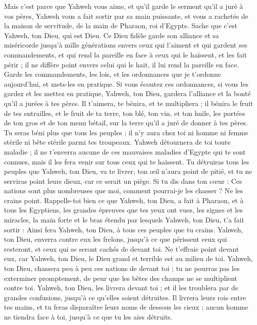 \begin{multicols}{2}
Mais c'est parce que Yahweh vous aime, et qu'il garde le serment qu’il a juré à vos pères, Yahweh vous a fait sortir par sa main puissante, et vous a rachetés de la maison de servitude, de la main de Pharaon, roi d'Egypte.
Sache que c'est Yahweh, ton Dieu, qui est Dieu. Ce Dieu fidèle garde son alliance et sa miséricorde jusqu'à mille générations envers ceux qui l'aiment et qui gardent ses commandements,
et qui rend la pareille en face à ceux qui le haïssent, et les fait périr ; il ne diffère point envers celui qui le hait, il lui rend la pareille en face.
Garde les commandements, les lois, et les ordonnances que je t’ordonne aujourd'hui, et mets-les en pratique.
Si vous écoutez ces ordonnances, si vous les gardez et les mettez en pratique, Yahweh, ton Dieu, gardera l'alliance et la bonté qu'il a jurées à tes pères.
Il t'aimera, te bénira, et te multipliera ; il bénira le fruit de tes entrailles, et le fruit de ta terre, ton blé, ton vin, et ton huile, les portées de ton gros et de ton menu bétail, sur la terre qu'il a juré de donner à tes pères.
Tu seras béni plus que tous les peuples ; il n'y aura chez toi ni homme ni femme stérile ni bête stérile parmi tes troupeaux.
Yahweh détournera de toi toute maladie ; il ne t’enverra aucune de ces mauvaises maladies d'Egypte qui te sont connues, mais il les fera venir sur tous ceux qui te haïssent.
Tu détruiras tous les peuples que Yahweh, ton Dieu, va te livrer, ton œil n’aura point de pitié, et tu ne serviras point leurs dieux, car ce serait un piège.
Si tu dis dans ton cœur : Ces nations sont plus nombreuses que moi, comment pourrai-je les chasser ?
Ne les crains point. Rappelle-toi bien ce que Yahweh, ton Dieu, a fait à Pharaon, et à tous les Egyptiens,
les grandes épreuves que tes yeux ont vues, les signes et les miracles, la main forte et le bras étendu par lesquels Yahweh, ton Dieu, t'a fait sortir : Ainsi fera Yahweh, ton Dieu, à tous ces peuples que tu crains.
Yahweh, ton Dieu, enverra contre eux les frelons, jusqu'à ce que périssent ceux qui resteront, et ceux qui se seront cachés de devant toi.
Ne t'effraie point devant eux, car Yahweh, ton Dieu, le Dieu grand et terrible est au milieu de toi.
Yahweh, ton Dieu, chassera peu à peu ces nations de devant toi ; tu ne pourras pas les exterminer promptement, de peur que les bêtes des champs ne se multiplient contre toi.
Yahweh, ton Dieu, les livrera devant toi ; et il les troublera par de grandes confusions, jusqu'à ce qu'elles soient détruites.
Il livrera leurs rois entre tes mains, et tu feras disparaître leurs noms de dessous les cieux ; aucun homme ne tiendra face à toi, jusqu'à ce que tu les aies détruits.

\end{multicols}
